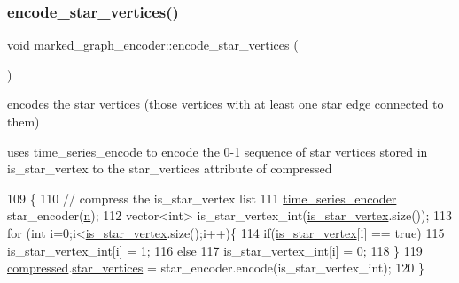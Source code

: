 \mbox{\label{classmarked__graph__encoder_af8daeed1452dbfd41fa2f875813e3496}} 
\subsubsection{\texorpdfstring{encode\+\_\+star\+\_\+vertices()}{encode\_star\_vertices()}}
{\footnotesize\ttfamily void marked\+\_\+graph\+\_\+encoder\+::encode\+\_\+star\+\_\+vertices (\begin{DoxyParamCaption}{ }\end{DoxyParamCaption})\hspace{0.3cm}{\ttfamily [private]}}



encodes the star vertices (those vertices with at least one star edge connected to them) 

uses time\+\_\+series\+\_\+encode to encode the 0-\/1 sequence of star vertices stored in is\+\_\+star\+\_\+vertex to the star\+\_\+vertices attribute of compressed 
\begin{DoxyCode}
109 \{
110   \textcolor{comment}{// compress the is\_star\_vertex list}
111   \hyperlink{classtime__series__encoder}{time\_series\_encoder} star\_encoder(\hyperlink{classmarked__graph__encoder_a4c66d9fdbc14c97523715aac7e4511cb}{n});
112   vector<int> is\_star\_vertex\_int(\hyperlink{classmarked__graph__encoder_ac36f6c2430af6fa4d20584569859bb59}{is\_star\_vertex}.size());
113   \textcolor{keywordflow}{for} (\textcolor{keywordtype}{int} i=0;i<\hyperlink{classmarked__graph__encoder_ac36f6c2430af6fa4d20584569859bb59}{is\_star\_vertex}.size();i++)\{
114     \textcolor{keywordflow}{if}(\hyperlink{classmarked__graph__encoder_ac36f6c2430af6fa4d20584569859bb59}{is\_star\_vertex}[i] == \textcolor{keyword}{true})
115       is\_star\_vertex\_int[i] = 1;
116     \textcolor{keywordflow}{else}
117       is\_star\_vertex\_int[i] = 0;
118   \}
119   \hyperlink{classmarked__graph__encoder_ac2ded200860fdd2321f86dd76b28bcb3}{compressed}.\hyperlink{classmarked__graph__compressed_a7a4ced4586e2e353f9076bd447df5208}{star\_vertices} = star\_encoder.encode(is\_star\_vertex\_int);
120 \}
\end{DoxyCode}
\mbox{\label{classmarked__graph__encoder_a239769085214166e09cb56de750a8d71}} 
